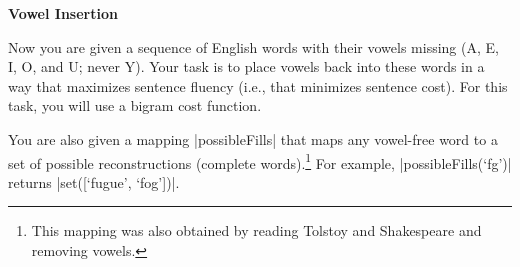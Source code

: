 \item {\bf Vowel Insertion}

Now you are given a sequence of English words with their vowels missing (A, E,
I, O, and U; never Y).  Your task is to place vowels back into these words in a
way that maximizes sentence fluency (i.e., that minimizes sentence cost).  For
this task, you will use a bigram cost function.

You are also given a mapping |possibleFills| that maps any vowel-free word to a
set of possible reconstructions (complete words).\footnote{This mapping was also
obtained by reading Tolstoy and Shakespeare and removing vowels.} For example,
|possibleFills(`fg')| returns |set([`fugue', `fog'])|.

\begin{enumerate}

  

  

  

\end{enumerate}
